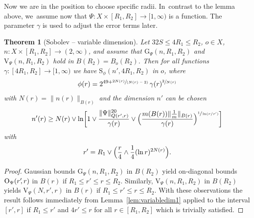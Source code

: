 \documentclass[10pt]{amsart}
\newcommand{\spfrac}[2]{\sfrac{#1}{(#2)}}
\newcommand{\rG}{\mathrm{G}}
\newcommand{\rS}{\mathrm{S}}
\newcommand{\rV}{\mathrm{V}}
\newcommand{\rO}{\mathrm{O}}
\theoremstyle{plain}
\newtheorem{theorem}{Theorem}[section]
\theoremstyle{definition}
\begin{document}
Now we are in the position to choose specific radii. In~contrast to the lemma above, we~assume now that $\Psi\colon X\times [R_1,R_2]\to [1,\infty)$ is a function. The parameter $\gamma$ is used to adjust the error terms later.

\begin{theorem}[Sobolev -- variable dimension]\label{thm:heattosobolevgeneralimproving}
Let $32S\leq {4} R_1\leq R_2$, $ o\in X $, $n\colon X\times [R_1,R_2]\to (2,\infty)$, and assume that $\rG_{\Psi}(n,R_1,R_2)$ and $\rV_{\Psi} (n,R_1,R_2)$ hold in $B(R_2)=B_{o}(R_{2})$.
Then for all functions $\gamma\colon [4R_1,R_2]\to [1,\infty)$ we have $\rS_{\phi}(n',{4} R_1,R_2)$ in $o$, where
\begin{align*}
\phi(r)=2^{49+\spfrac{2 N(r)}{N(r)-2}}\,\gamma(r)^{\sfrac{2}{N(r)}}
\end{align*}
with $N(r)=\|n(r)\|_{B(r)}$ and the dimension $ n' $ can be chosen
\begin{align*}
n'(r)\geq N(r)\vee \ln\biggl[1\vee
\frac{{\Vert\Psi\Vert_{Q(r',r)}^{20}}}{\gamma(r)}\vee \Bigl(\frac{m(B(r))\Vert \frac1m\Vert_{B(r)}}{\gamma(r)}\Bigr)^{\sfrac{1}{\ln(r/r')}}
\biggr]
\end{align*}
with
\[
r'= R_1\vee\Bigl( \frac{r}{4}\wedge \frac{1}{4}(\ln r)^{2N(r)}\Bigr).
\]
\end{theorem}

\begin{proof}Gaussian bounds $\rG_\Psi(n,R_1,R_2)$ in $B(R_2)$ yield on-diagonal bounds~$\rO_\Psi(r'\mkern-4mu,r)$ in $B(r)$ if $R_1\leq {r}'\leq r\leq R_2$. Similarly, $\rV_\Psi (n,R_1,R_2)$ in $B(R_2)$ yields $\rV_\Psi (N,r',r)$ in $B(r)$ if $R_1\leq r'\leq r\leq R_2$. With these observations the
result follows immediately from Lemma~\ref{lem:variabledim1} applied to the interval $[r',r]$ if $R_1\leq {r}'$ and ${4} r'\leq r$ for all $r\in[R_1,R_2]$ which is trivially satisfied.
\end{proof}
\end{document}
